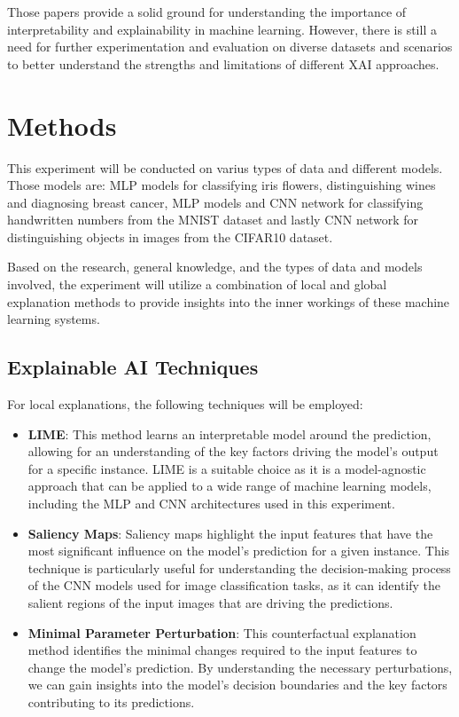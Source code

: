 \documentclass[conference]{IEEEtran}
\begin{document}
    Those papers provide a solid ground for understanding the importance of interpretability and explainability in machine learning.
    However, there is still a need for further experimentation and evaluation on diverse datasets and scenarios to better understand the strengths and limitations of different XAI approaches.

\section{Methods}\label{sec:methodology}

    This experiment will be conducted on varius types of data and different models.
    Those models are: MLP models for classifying iris flowers, distinguishing wines and diagnosing breast cancer, MLP models and CNN network for classifying handwritten numbers from the MNIST dataset and lastly CNN network for distinguishing objects in images from the CIFAR10 dataset.

    Based on the research, general knowledge, and the types of data and models involved, the experiment will utilize a combination of local and global explanation methods to provide insights into the inner workings of these machine learning systems.

\subsection{Explainable AI Techniques}\label{subsec:explainable-ai-techniques}

    For local explanations, the following techniques will be employed:

    \begin{itemize}
    \item \textbf{LIME}: This method learns an interpretable model around the prediction, allowing for an understanding of the key factors driving the model's output for a specific instance. LIME is a suitable choice as it is a model-agnostic approach that can be applied to a wide range of machine learning models, including the MLP and CNN architectures used in this experiment.
    \item \textbf{Saliency Maps}: Saliency maps highlight the input features that have the most significant influence on the model's prediction for a given instance. This technique is particularly useful for understanding the decision-making process of the CNN models used for image classification tasks, as it can identify the salient regions of the input images that are driving the predictions.
    \item \textbf{Minimal Parameter Perturbation}: This counterfactual explanation method identifies the minimal changes required to the input features to change the model's prediction. By understanding the necessary perturbations, we can gain insights into the model's decision boundaries and the key factors contributing to its predictions.
    \end{itemize}
\end{document}
